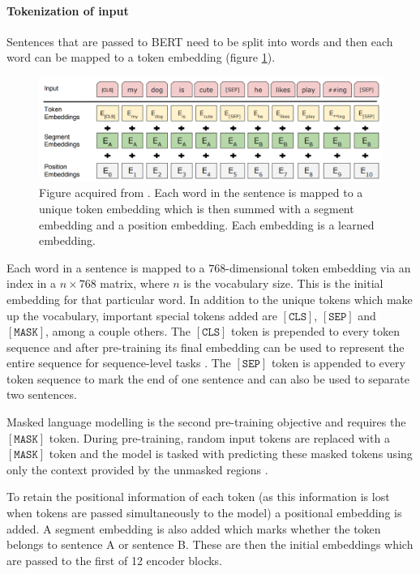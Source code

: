 \documentclass{article}
\begin{document}
\paragraph{Tokenization of input} Sentences that are passed to BERT need to be split into words and then each word can be mapped to a token embedding (figure \ref{fig:token}).

\begin{figure}[H]
    \centering
    \includegraphics[width=0.9\linewidth]{images/token.png}
    \caption{Figure acquired from \cite{devlin2019bert}. Each word in the sentence is mapped to a unique token embedding which is then summed with a segment embedding and a position embedding. Each embedding is a learned embedding.}
    \label{fig:token}
\end{figure}

Each word in a sentence is mapped to a $768$-dimensional token embedding via an index in a $n \times 768$ matrix, where $n$ is the vocabulary size. This is the initial embedding for that particular word. In addition to the unique tokens which make up the vocabulary, important special tokens added are $[\texttt{CLS}]$, $[\texttt{SEP}]$ and $[\texttt{MASK}]$, among a couple others. The $[\texttt{CLS}]$ token is prepended to every token sequence and after pre-training its final embedding can be used to represent the entire sequence for sequence-level tasks \cite{devlin2019bert}. The $[\texttt{SEP}]$ token is appended to every token sequence to mark the end of one sentence and can also be used to separate two sentences. 

Masked language modelling is the second pre-training objective and requires the $[\texttt{MASK}]$ token. During pre-training, random input tokens are replaced with a $[\texttt{MASK}]$ token and the model is tasked with predicting these masked tokens using only the context provided by the unmasked regions \cite{devlin2019bert}. 

To retain the positional information of each token (as this information is lost when tokens are passed simultaneously to the model) a positional embedding is added. A segment embedding is also added which marks whether the token belongs to sentence A or sentence B. These are then the initial embeddings which are passed to the first of 12 encoder blocks.
\end{document}
